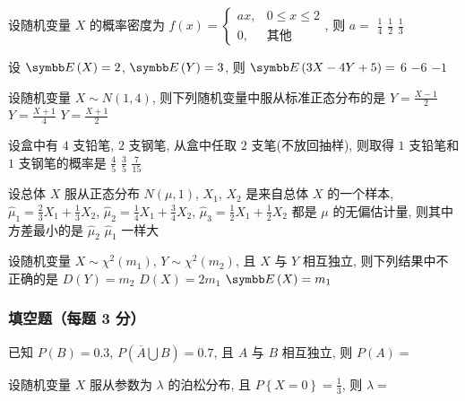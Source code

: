 \begin{ti}
	设随机变量 $X$ 的概率密度为 $f(x)=
	\begin{cases}
	ax, & 0\leqslant x\leqslant 2\\
	0, & \text{其他}
	\end{cases}
	$, 则 $a=$ \kuo{}
	{$\frac{1}{4}$}
	{$\frac{1}{2}$}
	{$\frac{1}{3}$}
\end{ti}

\begin{ti}
	设 $\EE(X)=2$, $\EE(Y)=3$, 则 $\EE(3X-4Y+5)=$ \kuo{}
	{6}
	{$-6$}
	{$-1$}
\end{ti}

\begin{ti}
	设随机变量 $X\sim N(1,4)$, 则下列随机变量中服从标准正态分布的是 \kuo{}
	{$Y=\frac{X-1}{2}$}
	{$Y=\frac{X+1}{4}$}
	{$Y=\frac{X+1}{2}$}
\end{ti}

\begin{ti}
	设盒中有 $4$ 支铅笔, $2$ 支钢笔, 从盒中任取 $2$ 支笔(不放回抽样), 则取得 $1$ 支铅笔和 $1$ 支钢笔的概率是 \kuo{}
	{$\frac{4}{5}$}
	{$\frac{3}{5}$}
	{$\frac{7}{15}$}
\end{ti}

\begin{ti}
	设总体 $X$ 服从正态分布 $N(\mu,1)$, $X_1$, $X_2$ 是来自总体 $X$ 的一个样本, $\hat\mu_1=\frac{2}{3}X_1+\frac{1}{3}X_2$, 
	$\hat\mu_2=\frac{1}{4}X_1+\frac{3}{4}X_2$, $\hat\mu_3=\frac{1}{2}X_1+\frac{1}{2}X_2$ 都是 $\mu$ 的无偏估计量, 则其中方差最小的是 \kuo{}
	{$\hat\mu_2$}
	{$\hat\mu_1$}
	{一样大}
\end{ti}

\begin{ti}
	设随机变量 $X\sim\chi^2(m_1)$, $Y\sim\chi^2(m_2)$, 且 $X$ 与 $Y$ 相互独立, 则下列结果中不正确的是 \kuo{}
	{$D(Y)=m_2$}
	{$D(X)=2m_1$}
	{$\EE(X)=m_1$}
\end{ti}

\subsubsection{填空题（每题 3 分）}
\begin{ti}
	已知 $P(B)=0.3$, $P\left(\overline{A}\bigcup B\right)=0.7$, 且 $A$ 与 $B$ 相互独立, 则 $P(A)=$ \hua{}
\end{ti}

\begin{ti}
	设随机变量 $X$ 服从参数为 $\lambda$ 的泊松分布, 且 $P\left\{X=0\right\}=\frac{1}{3}$, 则 $\lambda=$ \hua{}
\end{ti}

